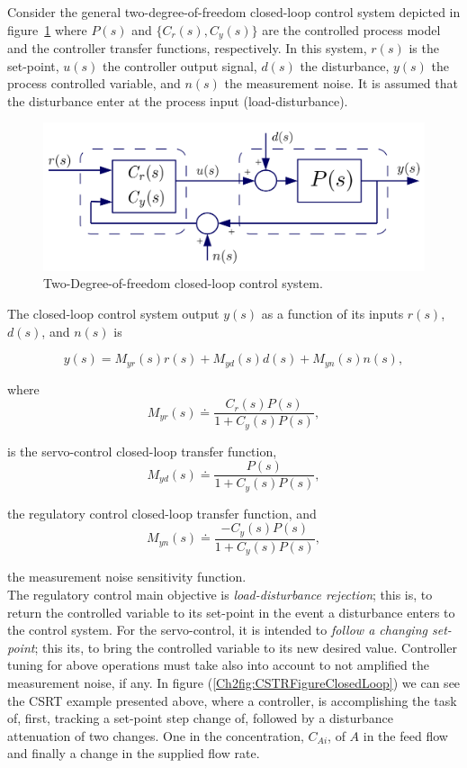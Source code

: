 Consider the general two-degree-of-freedom closed-loop control system depicted in figure~\ref{Ch2fig:DoFControlSystem} where $P(s)$ and $\{C_r(s), C_y(s)\}$ are the controlled process model and the controller transfer functions, respectively.  In this system, $r(s)$ is the set-point, $u(s)$ the controller output signal, $d(s)$ the disturbance, $y(s)$ the process controlled variable, and $n(s)$ the measurement noise. It is assumed that the disturbance enter at the process input (load-disturbance).

\begin{figure}[tb]
\centering
	\includegraphics[width=0.5\linewidth]{../figuras/Ch2DoFControlSystem} 
\caption{Two-Degree-of-freedom closed-loop control system.} 
\label{Ch2fig:DoFControlSystem}
\end{figure}


The closed-loop control system output $y(s)$ as a function of its inputs $r(s)$, $d(s)$, and $n(s)$ is

\begin{equation}
	y(s) = M_{yr}(s) r(s) + M_{yd}(s) d(s) + M_{yn}(s) n(s), \label{Ch2eq:yt}
\end{equation}

\noindent where
\begin{equation}
	M_{yr}(s) \doteq \frac{C_r(s)P(s)}{1+C_y(s)P(s)}, \label{Ch2eq:myr}
\end{equation}

\noindent is the servo-control closed-loop transfer function, 
\begin{equation}
	M_{yd}(s) \doteq \frac{P(s)}{1+C_y(s)P(s)}, \label{Ch2eq:myd}
\end{equation}

\noindent the regulatory control closed-loop transfer function, and
\begin{equation}
	M_{yn}(s) \doteq \frac{-C_y(s)P(s)}{1+C_y(s)P(s)}, \label{Ch2eq:myn}
\end{equation}

\noindent the measurement noise sensitivity function.\\

The regulatory control main objective is \emph{load-disturbance rejection}; this is, to return the controlled variable to its set-point in the event a disturbance enters to the control system.  For the servo-control, it is intended to \emph{follow a changing set-point}; this its, to bring the controlled variable to its new desired value. Controller tuning for above operations must take also into account to not amplified the measurement noise, if any.  In figure (\ref{Ch2fig:CSTRFigureClosedLoop}) we can see the CSRT example presented above, where a controller, is accomplishing the task of, first, tracking a set-point step change of, followed by a disturbance attenuation  of two changes. One  in the concentration, $C_{Ai}$, of $A$ in the feed flow and finally a change in the supplied flow rate.

